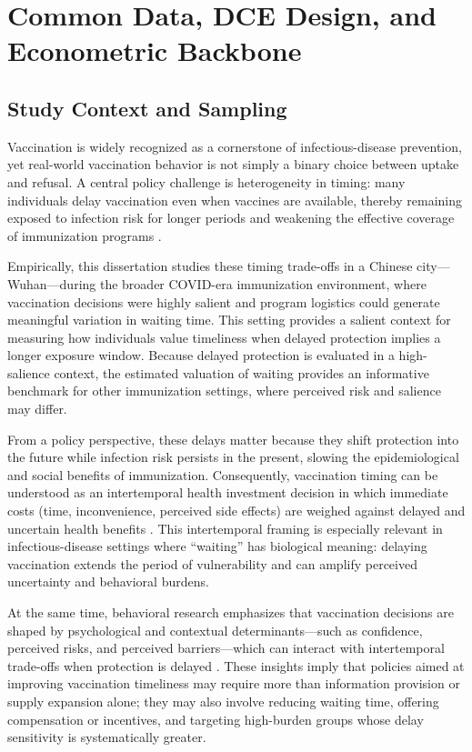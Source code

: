 \documentclass[doublespacing]{utdthesis}
\begin{document}
\chapter{Common Data, DCE Design, and Econometric Backbone}
\label{ch:common_methods}

\section{Study Context and Sampling}

Vaccination is widely recognized as a cornerstone of infectious-disease prevention, yet real-world vaccination behavior is not simply a binary choice between uptake and refusal. A central policy challenge is heterogeneity in timing: many individuals delay vaccination even when vaccines are available, thereby remaining exposed to infection risk for longer periods and weakening the effective coverage of immunization programs \citep{Halilova2022, Halilova2023}.

Empirically, this dissertation studies these timing trade-offs in a Chinese city---Wuhan---during the broader COVID-era immunization environment, where vaccination decisions were highly salient and program logistics could generate meaningful variation in waiting time. This setting provides a salient context for measuring how individuals value timeliness when delayed protection implies a longer exposure window. Because delayed protection is evaluated in a high-salience context, the estimated valuation of waiting provides an informative benchmark for other immunization settings, where perceived risk and salience may differ.

From a policy perspective, these delays matter because they shift protection into the future while infection risk persists in the present, slowing the epidemiological and social benefits of immunization. Consequently, vaccination timing can be understood as an intertemporal health investment decision in which immediate costs (time, inconvenience, perceived side effects) are weighed against delayed and uncertain health benefits \citep{Grossman1972, Meissner2025, Strickland2022}. This intertemporal framing is especially relevant in infectious-disease settings where ``waiting'' has biological meaning: delaying vaccination extends the period of vulnerability and can amplify perceived uncertainty and behavioral burdens.

At the same time, behavioral research emphasizes that vaccination decisions are shaped by psychological and contextual determinants---such as confidence, perceived risks, and perceived barriers---which can interact with intertemporal trade-offs when protection is delayed \citep{Halilova2024, Grytten2024}. These insights imply that policies aimed at improving vaccination timeliness may require more than information provision or supply expansion alone; they may also involve reducing waiting time, offering compensation or incentives, and targeting high-burden groups whose delay sensitivity is systematically greater.
\end{document}
